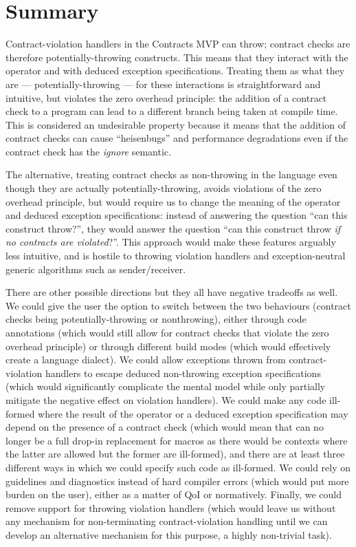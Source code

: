 \section{Summary}

Contract-violation handlers in the Contracts MVP can throw; contract checks are therefore potentially-throwing constructs. This means that they interact with the  operator and with deduced exception specifications. Treating them as what they are --- potentially-throwing --- for these interactions is straightforward and intuitive, but violates the zero overhead principle: the addition of a contract check to a program can lead to a different branch being taken at compile time. This is considered an undesirable property because it means that the addition of contract checks can cause ``heisenbugs'' and performance degradations even if the contract check has the \emph{ignore} semantic.

The alternative, treating contract checks as non-throwing in the language even though they are actually potentially-throwing, avoids violations of the zero overhead principle, but would require us to change the meaning of the  operator and deduced exception specifications: instead of answering the question ``can this construct throw?'', they would answer the question ``can this construct throw \emph{if no contracts are violated}?''. This approach would make these features arguably less intuitive, and is hostile to throwing violation handlers and exception-neutral generic algorithms such as sender/receiver.

There are other possible directions but they all have negative tradeoffs as well. We could give the user the option to switch between the two behaviours (contract checks being potentially-throwing or nonthrowing), either through code annotations (which would still allow for contract checks that violate the zero overhead principle) or through different build modes (which would effectively create a language dialect). We could allow exceptions thrown from contract-violation handlers to escape deduced non-throwing exception specifications (which would significantly complicate the mental model while only partially mitigate the negative effect on violation handlers). We could  make any code ill-formed where the result of the  operator or a deduced exception specification may depend on the presence of a contract check (which would mean that  can no longer be a full drop-in replacement for  macros as there would be contexts where the latter are allowed but the former are ill-formed), and there are at least three different ways in which we could specify such code as ill-formed. We could rely on guidelines and diagnostics instead of hard compiler errors (which would put more burden on the user), either as a matter of QoI or normatively. Finally, we could remove support for throwing violation handlers (which would leave us without any mechanism for non-terminating contract-violation handling until we can develop an alternative mechanism for this purpose, a highly non-trivial task).


